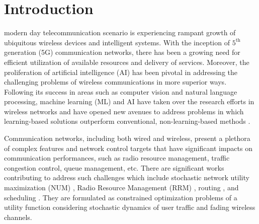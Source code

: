 \documentclass[lettersize,journal]{IEEEtran}
\begin{document}
\section{Introduction}
 modern day telecommunication scenario is experiencing rampant growth of ubiquitous wireless devices and intelligent systems. With the inception of $5^{\text{th}}$ generation (5G) communication networks, there has been a growing need for efficient utilization of available resources and delivery of services. Moreover, the proliferation of artificial intelligence (AI) has been pivotal in addressing the challenging problems of wireless communications in more superior ways. Following its success in areas such as computer vision and natural language processing, machine learning (ML) and AI have taken over the research efforts in wireless networks and have opened new avenues to address problems in which learning-based solutions outperform %
conventional, non-learning-based methods \cite{mao2018deep}. %

Communication networks, including both wired and wireless, present a plethora of complex features and network control targets that have significant impacts on communication performances, such as radio resource management, traffic congestion control, queue management, etc. There are significant works contributing to address such challenges which include stochastic network utility maximization (NUM) \cite{liu2015joint}, Radio Resource Management (RRM) \cite{eisen2020optimal, naderializadeh2023learning, naderializadeh2022state}, routing \cite{xia2018utility, zargham2013accelerated, ribeiro2009stochastic}, and scheduling \cite{xia2017stochastic, xia2014distributed, georgiadis2006resource}. They are formulated as constrained optimization problems of a utility function considering stochastic dynamics of user traffic and fading wireless channels.
\end{document}
